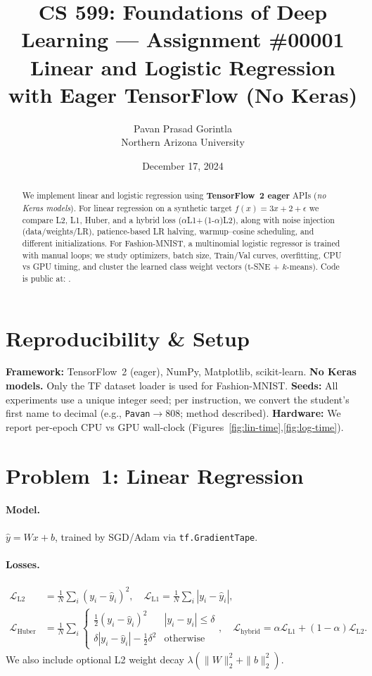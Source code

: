 \documentclass{article}
\title{CS 599: Foundations of Deep Learning --- Assignment \#00001\\
Linear and Logistic Regression with Eager TensorFlow (No Keras)}
\author{Pavan Prasad Gorintla\\Northern Arizona University}
\date{December 17, 2024}
\begin{document}
\maketitle

\begin{abstract}
We implement linear and logistic regression using \textbf{TensorFlow~2 eager} APIs (\emph{no Keras models}). For linear regression on a synthetic target $f(x)=3x+2+\epsilon$ we compare L2, L1, Huber, and a hybrid loss ($\alpha$L1+\,(1-$\alpha$)L2), along with noise injection (data/weights/LR), patience-based LR halving, warmup--cosine scheduling, and different initializations. For Fashion-MNIST, a multinomial logistic regressor is trained with manual loops; we study optimizers, batch size, Train/Val curves, overfitting, CPU vs GPU timing, and cluster the learned class weight vectors (t-SNE + $k$-means). Code is public at: \textbf{\color{blue}{[Insert Your GitHub Link Here]}}.
\end{abstract}

\section{Reproducibility \& Setup}
\textbf{Framework:} TensorFlow~2 (eager), NumPy, Matplotlib, scikit-learn. \textbf{No Keras models.} Only the TF dataset loader is used for Fashion-MNIST. \textbf{Seeds:} All experiments use a unique integer seed; per instruction, we convert the student's first name to decimal (e.g., \texttt{Pavan}$\to$808; method described). \textbf{Hardware:} We report per-epoch CPU vs GPU wall-clock (Figures~\ref{fig:lin-time},\ref{fig:log-time}).

\section{Problem~1: Linear Regression}
\paragraph{Model.} $\hat y = Wx + b$, trained by SGD/Adam via \texttt{tf.GradientTape}. 
\paragraph{Losses.} 
\begin{align}
\mathcal{L}_{\text{L2}} &= \frac{1}{N}\sum_i (y_i-\hat y_i)^2,\quad
\mathcal{L}_{\text{L1}} = \frac{1}{N}\sum_i |y_i-\hat y_i|,\\
\mathcal{L}_{\text{Huber}} &= \frac{1}{N}\sum_i \begin{cases}
\frac{1}{2}(y_i-\hat y_i)^2 & |y_i-\hat y_i|\le \delta\\
\delta|y_i-\hat y_i| - \frac{1}{2}\delta^2 & \text{otherwise}
\end{cases},\quad
\mathcal{L}_{\text{hybrid}}=\alpha \mathcal{L}_{\text{L1}} + (1-\alpha)\mathcal{L}_{\text{L2}}.
\end{align}
We also include optional L2 weight decay $\lambda(\|W\|_2^2+\|b\|_2^2)$.
\end{document}
